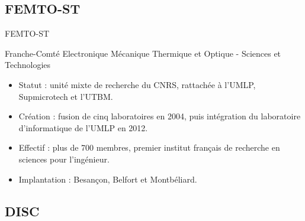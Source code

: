 \subsection{FEMTO-ST}

\begin{frame}{FEMTO-ST}
    \begin{block}{Franche-Comté Electronique Mécanique Thermique et Optique - Sciences et Technologies}
        \begin{itemize}
            \item Statut : unité mixte de recherche du CNRS, rattachée à l'UMLP, Supmicrotech et l'UTBM.
            \item Création : fusion de cinq laboratoires en 2004, puis intégration du laboratoire d'informatique de l'UMLP en 2012.
            \item Effectif : plus de 700 membres, premier institut français de recherche en sciences pour l'ingénieur.
            \item Implantation : Besançon, Belfort et Montbéliard.
        \end{itemize}
    \end{block}
\end{frame}

\subsection{DISC}

